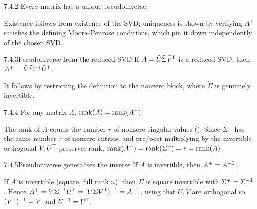 \begin{lems}{7.4.2}{}
Every matrix has a unique pseudoinverse.
\end{lems}

\begin{proofomit}Existence follows from existence of the SVD; uniqueness is shown by verifying $A^+$ satisfies the defining Moore--Penrose conditions, which pin it down independently of the chosen SVD.
\end{proofomit}

\begin{lems}{7.4.3}{Pseudoinverse from the reduced SVD}
If $A=\tilde U\tilde\Sigma\tilde V^{\mathsf{T}}$ is a reduced SVD, then $A^+=\tilde V\tilde\Sigma^{-1}\tilde U^{\mathsf{T}}$.
\end{lems}

\begin{proofomit}It follows by restricting the definition to the nonzero block, where $\tilde\Sigma$ is genuinely invertible.
\end{proofomit}

\begin{lems}{7.4.4}{}
For any matrix $A$, $\operatorname{rank}(A)=\operatorname{rank}(A^+)$.
\end{lems}

\begin{prf}
The rank of $A$ equals the number $r$ of nonzero singular values (). Since $\Sigma^+$ has the same number $r$ of nonzero entries, and pre/post-multiplying by the invertible orthogonal $V,U^{\mathsf{T}}$ preserves rank, $\operatorname{rank}(A^+)=\operatorname{rank}(\Sigma^+)=r=\operatorname{rank}(A)$.
\end{prf}

\begin{lems}{7.4.5}{Pseudoinverse generalises the inverse}
If $A$ is invertible, then $A^+=A^{-1}$.
\end{lems}

\begin{prf}
If $A$ is invertible (square, full rank $n$), then $\Sigma$ is square invertible with $\Sigma^+=\Sigma^{-1}$. Hence $A^+=V\Sigma^{-1} U^{\mathsf{T}}=(U\Sigma V^{\mathsf{T}})^{-1}=A^{-1}$, using that $U,V$ are orthogonal so $(V^{\mathsf{T}})^{-1}=V$ and $U^{-1}=U^{\mathsf{T}}$.
\end{prf}

